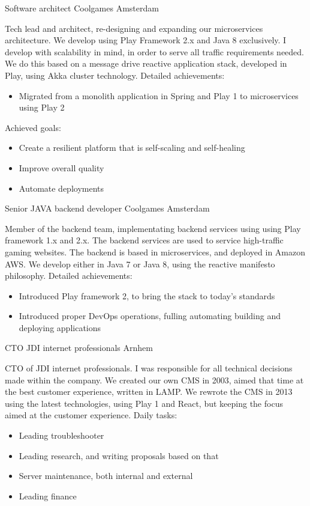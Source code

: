 \documentclass[11pt,a4paper]{moderncv}
\begin{document}
\vspace*{0.2\baselineskip}
{Software architect}
{Coolgames}
{Amsterdam}
{}
{
    Tech lead and architect, re-designing and expanding our microservices
    architecture. We develop using Play Framework 2.x and Java 8 exclusively.
    I develop with scalability in mind, in order to serve all traffic
    requirements needed. We do this based on a message drive reactive
    application stack, developed in Play, using Akka cluster technology.
    \newline{}%
    Detailed achievements:%
    \begin{itemize}
        \item Migrated from a monolith application in Spring and Play 1 to microservices using Play 2
    \end{itemize}
    Achieved goals:%
    \begin{itemize}
        \item Create a resilient platform that is self-scaling and self-healing
        \item Improve overall quality
        \item Automate deployments
    \end{itemize}
}

{Senior JAVA backend developer}
{Coolgames}
{Amsterdam}
{}
{
    Member of the backend team, implementating backend services using using Play framework 1.x and 2.x.
    The backend services are used to service high-traffic gaming websites. The backend is based 
    in microservices, and deployed in Amazon AWS.
    We develop either in Java 7 or Java 8, using the reactive manifesto philosophy.\newline{}%
    \newline{}%
    Detailed achievements:%
    \begin{itemize}
        \item Introduced Play framework 2, to bring the stack to today's standards
        \item Introduced proper DevOps operations, fulling automating building and deploying applications
    \end{itemize}
}

\vspace*{0.2\baselineskip}
{CTO}
{JDI internet professionals}
{Arnhem}
{}
{
    CTO of JDI internet professionals. I was responsible for all technical decisions made within the company.
    We created our own CMS in 2003, aimed that time at the best customer experience, written in LAMP.
    We rewrote the CMS in 2013 using the latest technologies, using Play 1 and React, but keeping the focus aimed at the customer experience.
    \newline{}%
    Daily tasks:%
    \begin{itemize}
        \item Leading troubleshooter
        \item Leading research, and writing proposals based on that
        \item Server maintenance, both internal and external
        \item Leading finance
    \end{itemize}
}
\end{document}
